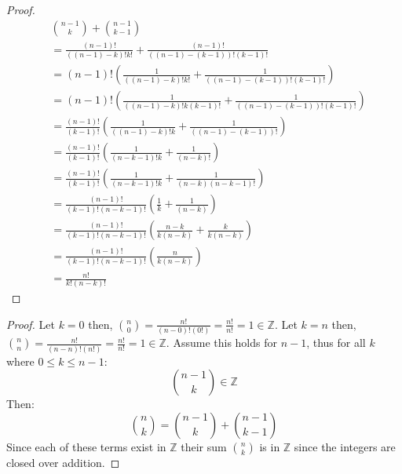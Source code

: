 \begin{proof}
    \begin{align*}
         & \binom{n - 1}{k} + \binom{n - 1}{k - 1}                                                             \\
         & = \frac{(n - 1)!}{((n - 1) - k)!k!} + \frac{(n - 1)!}{((n - 1) - (k - 1))!(k - 1)!}                 \\
         & =  (n - 1)!\left(\frac{1}{((n - 1) - k)!k!} + \frac{1}{((n - 1) - (k - 1))!(k - 1)!}\right)         \\
         & =  (n - 1)!\left(\frac{1}{((n - 1) - k)!k(k - 1)!} + \frac{1}{((n - 1) - (k - 1))!(k - 1)!}\right)  \\
         & =  \frac{(n - 1)!}{(k - 1)!}\left(\frac{1}{((n - 1) - k)!k} + \frac{1}{((n - 1) - (k - 1))!}\right) \\
         & =  \frac{(n - 1)!}{(k - 1)!}\left(\frac{1}{(n - k - 1)!k} + \frac{1}{(n - k)!}\right)               \\
         & =  \frac{(n - 1)!}{(k - 1)!}\left(\frac{1}{(n - k - 1)!k} + \frac{1}{(n - k)(n - k - 1)!}\right)    \\
         & =  \frac{(n - 1)!}{(k - 1)!(n - k - 1)!}\left(\frac{1}{k} + \frac{1}{(n - k)}\right)                \\
         & =  \frac{(n - 1)!}{(k - 1)!(n - k - 1)!}\left(\frac{n - k}{k(n - k)} + \frac{k}{k(n - k)}\right)    \\
         & =  \frac{(n - 1)!}{(k - 1)!(n - k - 1)!}\left(\frac{n}{k(n - k)}\right)                             \\
         & =  \frac{n!}{k!(n - k)!}
    \end{align*}
\end{proof}

\begin{proof}
    Let $k = 0$ then, $\binom{n}{0} = \frac{n!}{(n - 0)!(0!)} = \frac{n!}{n!} = 1 \in \mathbb{Z}$.
    Let $k = n$ then, $\binom{n}{n} = \frac{n!}{(n - n)!(n!)} = \frac{n!}{n!} = 1 \in \mathbb{Z}$.
    Assume this holds for $n - 1$, thus for all $k$ where $0 \le k \le n - 1$:
    \[\binom{n - 1}{k} \in \mathbb{Z}\]
    Then:
    \[\binom{n}{k} =  \binom{n - 1}{k} + \binom{n - 1}{k - 1}\]
    Since each of these terms exist in $\mathbb{Z}$ their sum $\binom{n}{k}$ is in
    $\mathbb{Z}$ since the integers are closed over addition.
\end{proof}

